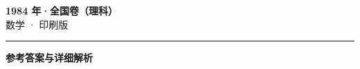 \documentclass[zihao=5, a4paper]{ctexart}
\begin{document}
\begin{center}
  {\Large\bfseries 1984 年·全国卷（理科）}\\[4pt]
  {\large 数学 · 印刷版}
\end{center}
\medskip
{}

\par\bigskip\hrule\bigskip
{}
\begin{center}{\large\bfseries 参考答案与详细解析}\end{center}
\smallskip

\end{document}
